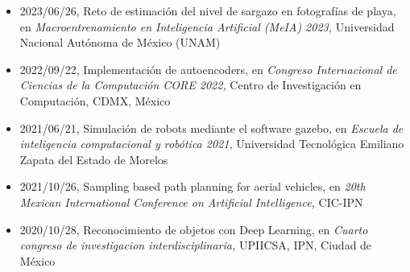 \begin{itemize} 
\item 2023/06/26, Reto de estimación del nivel de sargazo en fotografías de playa, en \textit{ Macroentrenamiento en Inteligencia Artificial (MeIA) 2023,} Universidad Nacional Autónoma de México (UNAM) 
\item 2022/09/22, Implementación de autoencoders, en \textit{ Congreso Internacional de Ciencias de la Computación CORE 2022,} Centro de Investigación en Computación, CDMX, México 
\item 2021/06/21, Simulación de robots mediante el software gazebo, en \textit{ Escuela de inteligencia computacional y robótica 2021,} Universidad Tecnológica Emiliano Zapata del Estado de Morelos 
\item 2021/10/26, Sampling based path planning for aerial vehicles, en \textit{ 20th Mexican International Conference on Artificial Intelligence,} CIC-IPN 
\item 2020/10/28, Reconocimiento de objetos con Deep Learning, en \textit{ Cuarto congreso de investigacion interdisciplinaria,} UPIICSA, IPN, Ciudad de México 
\end{itemize} 
